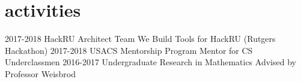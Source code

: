 \documentclass[]{friggeri-cv}
\begin{document}
\section{activities}
    \begin{entrylist}
        \entry
        {2017-2018}
        {HackRU Architect Team}
        {We Build Tools for HackRU (Rutgers Hackathon)}
        {\vspace{-0.3cm}}
        \entry
        {2017-2018}
        {USACS Mentorship Program}
        {Mentor for CS Underclassmen}
        {\vspace{-0.3cm}}
        \entry
        {2016-2017}
        {Undergraduate Research in Mathematics}
        {Advised by Professor Weisbrod}
        {}
    \end{entrylist}
    \vspace{-1.0cm}
\end{document}
